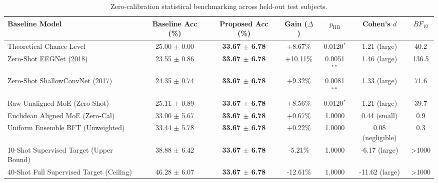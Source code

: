 \begin{table}[t]
\centering
\small
\caption{Zero-calibration statistical benchmarking across held-out test subjects.}
\label{tab:paper2_statistical_benchmarks}
\begin{tabular}{lcccccc}
\toprule
\textbf{Baseline Model} & \textbf{Baseline Acc (\%)} & \textbf{Proposed Acc (\%)} & \textbf{Gain ($\Delta$)} & \textbf{$p_{\text{HB}}$} & \textbf{Cohen's $d$} & \textbf{$BF_{10}$} \\
\midrule
Theoretical Chance Level & 25.00 $\pm$ 0.00 & \textbf{33.67 $\pm$ 6.78} & +8.67\% & 0.0120$^{*}$ & 1.21 (large) & 40.2 \\
Zero-Shot EEGNet (2018) & 23.55 $\pm$ 0.86 & \textbf{33.67 $\pm$ 6.78} & +10.11\% & 0.0051$^{**}$ & 1.46 (large) & 136.5 \\
Zero-Shot ShallowConvNet (2017) & 24.35 $\pm$ 0.74 & \textbf{33.67 $\pm$ 6.78} & +9.32\% & 0.0081$^{**}$ & 1.33 (large) & 71.6 \\
Raw Unaligned MoE (Zero-Shot) & 25.11 $\pm$ 0.89 & \textbf{33.67 $\pm$ 6.78} & +8.56\% & 0.0120$^{*}$ & 1.21 (large) & 39.7 \\
Euclidean Aligned MoE (Zero-Cal) & 33.00 $\pm$ 5.67 & \textbf{33.67 $\pm$ 6.78} & +0.67\% & 1.0000 & 0.44 (small) & 0.9 \\
Uniform Ensemble BFT (Unweighted) & 33.44 $\pm$ 5.78 & \textbf{33.67 $\pm$ 6.78} & +0.22\% & 1.0000 & 0.08 (negligible) & 0.3 \\
10-Shot Supervised Target (Upper Bound) & 38.88 $\pm$ 6.42 & \textbf{33.67 $\pm$ 6.78} & -5.21\% & 1.0000 & -6.17 (large) & >1000 \\
40-Shot Full Supervised Target (Ceiling) & 46.28 $\pm$ 6.07 & \textbf{33.67 $\pm$ 6.78} & -12.61\% & 1.0000 & -11.62 (large) & >1000 \\
\bottomrule
\end{tabular}
\end{table}